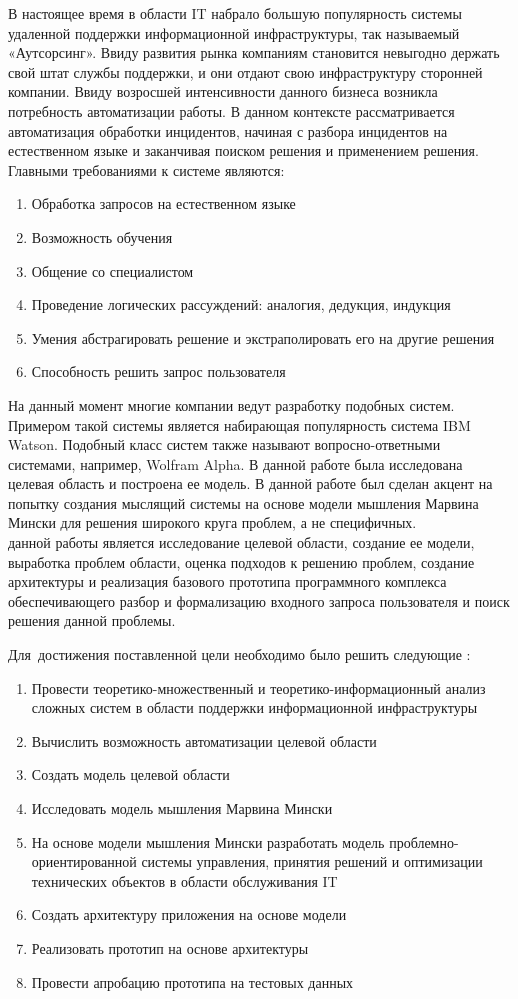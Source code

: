 {\actuality}
В настоящее время в области IT набрало большую популярность системы удаленной поддержки информационной инфраструктуры, так называемый «Аутсорсинг». Ввиду развития рынка компаниям становится невыгодно держать свой штат службы поддержки, и они отдают свою инфраструктуру сторонней компании.
Ввиду возросшей интенсивности данного бизнеса возникла потребность автоматизации работы. В данном контексте рассматривается автоматизация обработки инцидентов, начиная с разбора инцидентов на естественном языке и заканчивая поиском решения и применением решения.
Главными требованиями к системе являются:
\begin{enumerate}
  \item Обработка запросов на естественном языке
  \item Возможность обучения
  \item Общение со специалистом
  \item Проведение логических рассуждений: аналогия, дедукция, индукция
  \item Умения абстрагировать решение и экстраполировать его на другие решения
  \item Способность решить запрос пользователя
\end{enumerate}

На данный момент многие компании ведут разработку подобных систем. Примером такой системы является набирающая популярность система IBM Watson. Подобный класс систем также называют вопросно-ответными системами, например, Wolfram Alpha.
В данной работе была исследована целевая область и построена ее модель. 
В данной работе был сделан акцент на попытку создания мыслящий системы на основе модели мышления Марвина Мински для решения широкого круга проблем, а не специфичных. \\
{\aim} данной работы является исследование целевой области, создание ее модели, выработка проблем области, оценка подходов к решению проблем,  создание архитектуры и реализация базового прототипа программного комплекса обеспечивающего разбор и формализацию входного запроса пользователя и поиск решения данной проблемы.

Для~достижения поставленной цели необходимо было решить следующие {\tasks}:
\begin{enumerate}
  \item Провести теоретико-множественный и теоретико-информационный анализ сложных систем в области поддержки информационной инфраструктуры
  \item Вычислить возможность автоматизации целевой области
  \item Создать модель целевой области
  \item Исследовать модель мышления Марвина Мински
  \item На основе модели мышления Мински разработать модель проблемно-ориентированной системы управления, принятия решений и оптимизации технических объектов в области обслуживания IT  
  \item Создать архитектуру приложения на основе модели
  \item Реализовать прототип на основе архитектуры
  \item Провести апробацию прототипа на тестовых данных
\end{enumerate}

